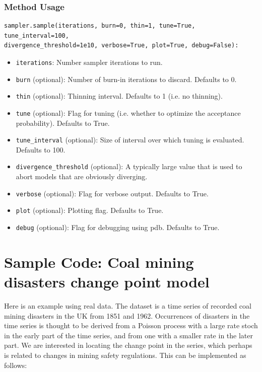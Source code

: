 \documentclass[]{book}
\begin{document}
\subsubsection{Method Usage}
\begin{verbatim}
sampler.sample(iterations, burn=0, thin=1, tune=True, tune_interval=100,
divergence_threshold=1e10, verbose=True, plot=True, debug=False):
\end{verbatim}
\begin{itemize}

\item \verb=iterations=: Number sampler iterations to run.

\item \verb=burn= (optional): Number of burn-in iterations to discard. Defaults to 0.

\item \verb=thin= (optional): Thinning interval. Defaults to 1 (i.e. no thinning).

\item \verb=tune= (optional): Flag for tuning (i.e. whether to optimize the acceptance probability). Defaults to True.

\item \verb=tune_interval= (optional): Size of interval over which tuning is evaluated. Defaults to 100.

\item \verb=divergence_threshold= (optional): A typically large value that is used to abort models that are obviously diverging.

\item \verb=verbose= (optional): Flag for verbose output. Defaults to True.

\item \verb=plot= (optional): Plotting flag. Defaults to True.

\item \verb=debug= (optional): Flag for debugging using pdb. Defaults to True.
\end{itemize}

\section{Sample Code: Coal mining disasters change point model}

Here is an example using real data. The dataset is a time series of recorded coal mining disasters in the UK from 1851 and 1962. Occurrences of disasters in the time series is thought to be derived from a Poisson process with a large rate stoch in the early part of the time series, and from one with a smaller rate in the later part. We are interested in locating the change point in the series, which perhaps is related to changes in mining safety regulations. This can be implemented as follows:
\end{document}
